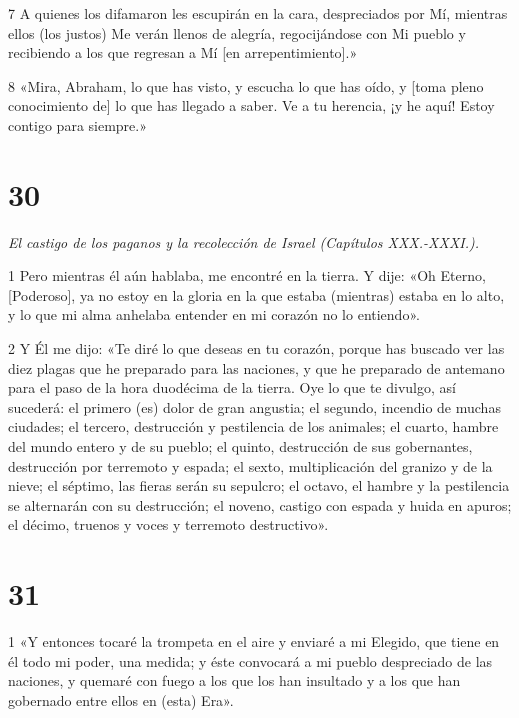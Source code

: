 \par 7 A quienes los difamaron les escupirán en la cara, despreciados por Mí, mientras ellos (los justos) Me verán llenos de alegría, regocijándose con Mi pueblo y recibiendo a los que regresan a Mí [en arrepentimiento].»

\par 8 «Mira, Abraham, lo que has visto, y escucha lo que has oído, y [toma pleno conocimiento de] lo que has llegado a saber. Ve a tu herencia, ¡y he aquí! Estoy contigo para siempre.»

\chapter{30}

\par \textit{El castigo de los paganos y la recolección de Israel (Capítulos XXX.-XXXI.).}

\par 1 Pero mientras él aún hablaba, me encontré en la tierra. Y dije: «Oh Eterno, [Poderoso], ya no estoy en la gloria en la que estaba (mientras) estaba en lo alto, y lo que mi alma anhelaba entender en mi corazón no lo entiendo».

\par 2 Y Él me dijo: «Te diré lo que deseas en tu corazón, porque has buscado ver las diez plagas que he preparado para las naciones, y que he preparado de antemano para el paso de la hora duodécima de la tierra. Oye lo que te divulgo, así sucederá: el primero (es) dolor de gran angustia; el segundo, incendio de muchas ciudades; el tercero, destrucción y pestilencia de los animales; el cuarto, hambre del mundo entero y de su pueblo; el quinto, destrucción de sus gobernantes, destrucción por terremoto y espada; el sexto, multiplicación del granizo y de la nieve; el séptimo, las fieras serán su sepulcro; el octavo, el hambre y la pestilencia se alternarán con su destrucción; el noveno, castigo con espada y huida en apuros; el décimo, truenos y voces y terremoto destructivo».

\chapter{31}

\par 1 «Y entonces tocaré la trompeta en el aire y enviaré a mi Elegido, que tiene en él todo mi poder, una medida; y éste convocará a mi pueblo despreciado de las naciones, y quemaré con fuego a los que los han insultado y a los que han gobernado entre ellos en (esta) Era».

